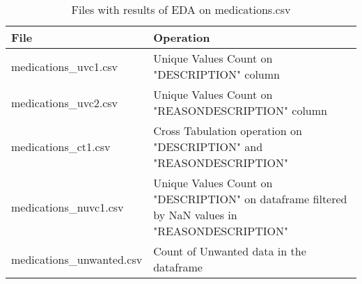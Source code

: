 \documentclass[12pt, twosided]{report}  %
\begin{document}
\begin{table}[H]
	\centering
	\begin{tabular}{p{4.5cm}|p{15cm}}
		\textbf{File} & \textbf{Operation} \\ \hline
		medications\_uvc1.csv     & Unique Values Count on "DESCRIPTION" column \\
		medications\_uvc2.csv     & Unique Values Count on "REASONDESCRIPTION" column \\
		medications\_ct1.csv      & Cross Tabulation operation on "DESCRIPTION" and "REASONDESCRIPTION" \\
		medications\_nuvc1.csv    & Unique Values Count on "DESCRIPTION" on dataframe filtered by NaN values in "REASONDESCRIPTION" \\
		medications\_unwanted.csv & Count of Unwanted data in the dataframe 
	\end{tabular}
	\caption{Files with results of EDA on medications.csv}
\end{table}


\end{document}

